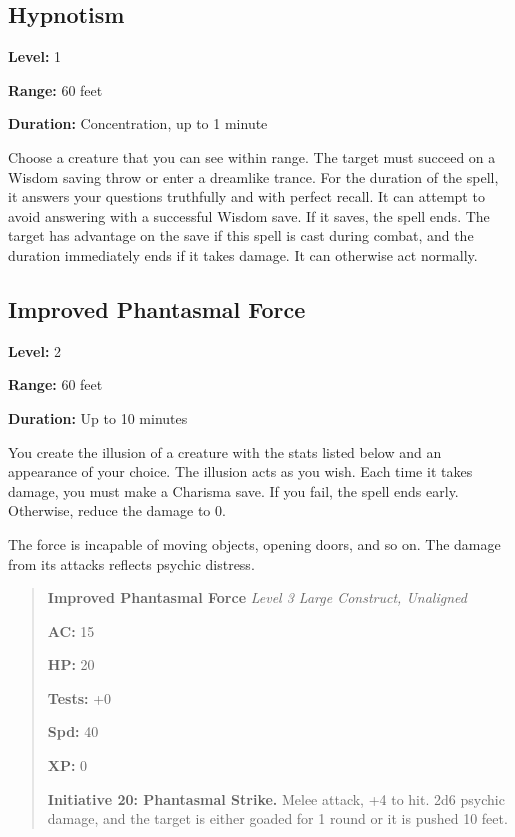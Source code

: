 \documentclass[12pt,letterpaper,twocolumn,openany,nodeprecatedcode,bg=none]{dndbook}
\let\oldsubsection\subsection
\renewcommand{\subsection}[1]{%
  \needspace{5\baselineskip}%
  \oldsubsection{#1}%
}
\begin{document}
\subsection{Hypnotism}\label{hypnotism}

\textbf{Level:} 1

\textbf{Range:} 60 feet

\textbf{Duration:} Concentration, up to 1 minute

Choose a creature that you can see within range. The target must succeed
on a Wisdom saving throw or enter a dreamlike trance. For the duration
of the spell, it answers your questions truthfully and with perfect
recall. It can attempt to avoid answering with a successful Wisdom save.
If it saves, the spell ends. The target has advantage on the save if
this spell is cast during combat, and the duration immediately ends if
it takes damage. It can otherwise act normally.

\subsection{Improved Phantasmal Force}\label{improved-phantasmal-force}

\textbf{Level:} 2

\textbf{Range:} 60 feet

\textbf{Duration:} Up to 10 minutes

You create the illusion of a creature with the stats listed below and an
appearance of your choice. The illusion acts as you wish. Each time it
takes damage, you must make a Charisma save. If you fail, the spell ends
early. Otherwise, reduce the damage to 0.

The force is incapable of moving objects, opening doors, and so on. The
damage from its attacks reflects psychic distress.

\begin{quote}
\textbf{Improved Phantasmal Force} \emph{Level 3 Large Construct,
Unaligned}

\textbf{AC:} 15

\textbf{HP:} 20

\textbf{Tests:} +0

\textbf{Spd:} 40

\textbf{XP:} 0

\textbf{Initiative 20: Phantasmal Strike.} Melee attack, +4 to hit. 2d6
psychic damage, and the target is either goaded for 1 round or it is
pushed 10 feet.
\end{quote}
\end{document}
